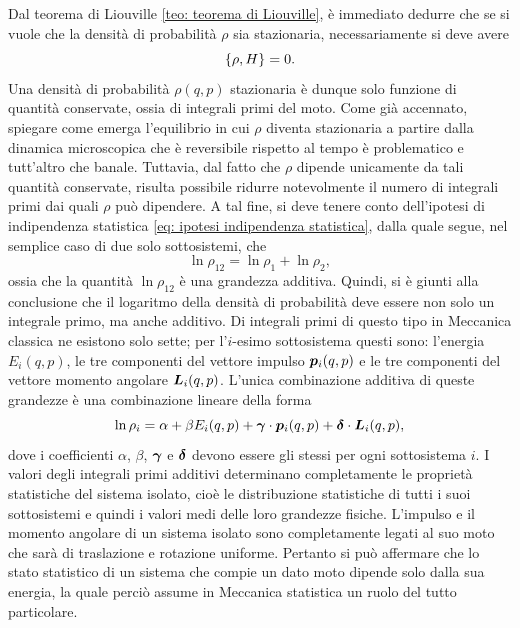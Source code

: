 Dal teorema di Liouville \eqref{teo: teorema di Liouville}, è immediato dedurre che se si vuole che la densità di probabilità $\rho$ sia stazionaria, necessariamente si deve avere 
\begin{equation}
    \{\rho,H\} = 0.
\end{equation}
Una densità di probabilità $\rho(q,p)$ stazionaria è dunque solo funzione di quantità conservate, ossia di integrali primi del moto. Come già accennato, spiegare come emerga l'equilibrio in cui $\rho$ diventa stazionaria a partire dalla dinamica microscopica che è reversibile rispetto al tempo è problematico e tutt'altro che banale. Tuttavia, dal fatto che $\rho$ dipende unicamente da tali quantità conservate, risulta possibile ridurre notevolmente il numero di integrali primi dai quali $\rho$ può dipendere. A tal fine, si deve tenere conto dell'ipotesi di indipendenza statistica \eqref{eq: ipotesi indipendenza statistica}, dalla quale segue, nel semplice caso di due solo sottosistemi, che
\begin{equation}
    \ln{\rho_{12}} = \ln{\rho_1} + \ln{\rho_2},
\end{equation}
ossia che la quantità $\ln{\rho_{12}}$ è una grandezza additiva. Quindi, si è giunti alla conclusione che il logaritmo della densità di probabilità deve essere non solo un integrale primo, ma anche additivo. Di integrali primi di questo tipo in Meccanica classica ne esistono solo sette; per l'$i$-esimo sottosistema questi sono: l'energia $E_i(q,p)$, le tre componenti del vettore impulso $\bm{p}_i(q,p)$ e le tre componenti del vettore momento angolare $\bm{L}_i(q,p)$. L'unica combinazione additiva di queste grandezze è una combinazione lineare della forma
\begin{equation}
    \ln{\rho_i} = \alpha +\beta E_i(q,p) + \bm{\gamma}\cdot\bm{p}_i(q,p) + \bm{\delta}\cdot\bm{L}_i(q,p),
\end{equation}
dove i coefficienti $\alpha$, $\beta$, $\bm{\gamma}$ e $\bm{\delta}$ devono essere gli stessi per ogni sottosistema $i$. I valori degli integrali primi additivi determinano completamente le proprietà statistiche del sistema isolato, cioè le distribuzione statistiche di tutti i suoi sottosistemi e quindi i valori medi delle loro grandezze fisiche. L'impulso e il momento angolare di un sistema isolato sono completamente legati al suo moto che sarà di traslazione e rotazione uniforme. Pertanto si può affermare che lo stato statistico di un sistema che compie un dato moto dipende solo dalla sua energia, la quale perciò assume in Meccanica statistica un ruolo del tutto particolare. 

